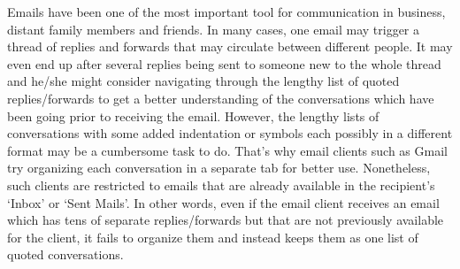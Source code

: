 \documentclass{llncs}
\begin{document}
\begin{figure}[tb]
\end{figure}

Emails have been one of the most important tool for communication in business, distant family members and friends.
In many cases, one email may trigger a thread of replies and forwards that may circulate between different people. It may even
end up after several replies being sent to someone new to the whole thread and he/she might consider navigating through
the lengthy list of quoted replies/forwards to get a better understanding of the conversations which have been going prior to 
receiving the email. However, the lengthy lists of conversations with some added indentation or symbols each possibly in a different
format may be a cumbersome task to do. That's why email clients such as Gmail try organizing each conversation in a separate tab for
better use. Nonetheless, such clients are restricted to emails that are already available in the recipient's `Inbox' or `Sent Mails'.
In other words, even if the email client receives an email which has 
tens of separate replies/forwards but that are not previously available for the client, it 
fails to organize them and instead keeps them as one list of quoted conversations.
\end{document}
